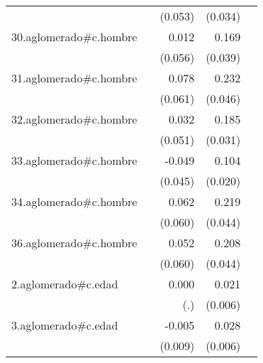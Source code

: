 {\begin{longtable}{l*{4}{D{.}{.}{-1}}}
            &                     &     (0.053)         &     (0.034)         &                     \\
\addlinespace
30.aglomerado#c.hombre&                     &       0.012         &       0.169\sym{***}&                     \\
            &                     &     (0.056)         &     (0.039)         &                     \\
\addlinespace
31.aglomerado#c.hombre&                     &       0.078         &       0.232\sym{***}&                     \\
            &                     &     (0.061)         &     (0.046)         &                     \\
\addlinespace
32.aglomerado#c.hombre&                     &       0.032         &       0.185\sym{***}&                     \\
            &                     &     (0.051)         &     (0.031)         &                     \\
\addlinespace
33.aglomerado#c.hombre&                     &      -0.049         &       0.104\sym{***}&                     \\
            &                     &     (0.045)         &     (0.020)         &                     \\
\addlinespace
34.aglomerado#c.hombre&                     &       0.062         &       0.219\sym{***}&                     \\
            &                     &     (0.060)         &     (0.044)         &                     \\
\addlinespace
36.aglomerado#c.hombre&                     &       0.052         &       0.208\sym{***}&                     \\
            &                     &     (0.060)         &     (0.044)         &                     \\
\addlinespace
2.aglomerado#c.edad&                     &       0.000         &       0.021\sym{***}&                     \\
            &                     &         (.)         &     (0.006)         &                     \\
\addlinespace
3.aglomerado#c.edad&                     &      -0.005         &       0.028\sym{***}&                     \\
            &                     &     (0.009)         &     (0.006)         &                     \\

\end{longtable}}
